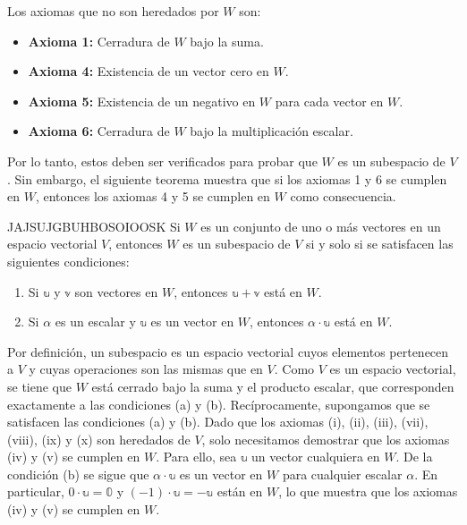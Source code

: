 \noindent Los axiomas que no son heredados por $W$ son:
\begin{itemize}
    \item \textbf{Axioma 1:} Cerradura de $W$ bajo la suma.
    \item \textbf{Axioma 4:} Existencia de un vector cero en $W$.
    \item \textbf{Axioma 5:} Existencia de un negativo en $W$ para cada vector en $W$.
    \item \textbf{Axioma 6:} Cerradura de $W$ bajo la multiplicación escalar.
\end{itemize}
Por lo tanto, estos deben ser verificados para probar que $W$ es un subespacio de $V$. Sin embargo, el siguiente teorema muestra que si los axiomas 1 y 6 se cumplen en $W$, entonces los axiomas 4 y 5 se cumplen en $W$ como consecuencia.

\begin{theorem}{}{JAJSUJGBUHBOSOIOOSK}
    Si $W$ es un conjunto de uno o más vectores en un espacio vectorial $V$, entonces $W$ es un subespacio de $V$ si y solo si se satisfacen las siguientes condiciones:
    \begin{enumerate}[label=\alph*), topsep=6pt, itemsep=0pt]
        \item Si $\mathbb{u}$ y $\mathbb{v}$ son vectores en $W$, entonces $\mathbb{u} + \mathbb{v}$ está en $W$.
        \item Si $\alpha$ es un escalar y $\mathbb{u}$ es un vector en $W$, entonces $\alpha \cdot \mathbb{u}$ está en $W$.
    \end{enumerate}

    \tcblower
    \demostracion Por definición, un subespacio es un espacio vectorial cuyos elementos pertenecen a $V$ y cuyas operaciones son las mismas que en $V$. Como $V$ es un espacio vectorial, se tiene que $W$ está cerrado bajo la suma y el producto escalar, que corresponden exactamente a las condiciones (a) y (b). Recíprocamente, supongamos que se satisfacen las condiciones (a) y (b). Dado que los axiomas (i), (ii), (iii), (vii), (viii), (ix) y (x) son heredados de $V$, solo necesitamos demostrar que los axiomas (iv) y (v) se cumplen en $W$. Para ello, sea $\mathbb{u}$ un vector cualquiera en $W$. De la condición (b) se sigue que $\alpha \cdot \mathbb{u}$ es un vector en $W$ para cualquier escalar $\alpha$. En particular, $0 \cdot \mathbb{u} = \mathbb{0}$ y $(-1) \cdot \mathbb{u} = -\mathbb{u}$ están en $W$, lo que muestra que los axiomas (iv) y (v) se cumplen en $W$. 
\end{theorem}

